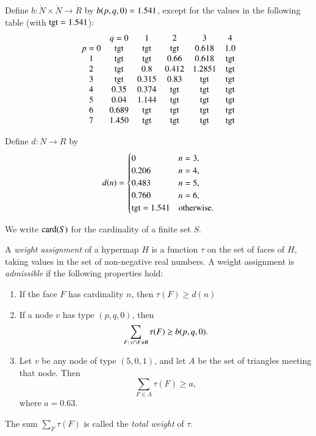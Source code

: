 \begin{definition}[b]
  Define $b:\ring{N}\times \ring{N}\to \ring{R}$ by $b(p,q,0)=1.541$,
  except for the values in the following table
  (with  ${\operatorname{tgt}}=1.541$):
  {
  \def\tx{\op{tgt}}
  $$\begin{matrix}  &q=0&1&2&3&4\\
           p=0&\tx&\tx&\tx&0.618&1.0\\
           1&\tx&\tx&0.66&0.618&\tx\\
           2&\tx&0.8&0.412&1.2851&\tx\\
           3&\tx&0.315&0.83&\tx&\tx\\
           4&0.35&0.374&\tx&\tx&\tx\\
           5&0.04&1.144&\tx&\tx&\tx\\
           6&0.689&\tx&\tx&\tx&\tx\\
           7&1.450&\tx&\tx&\tx&\tx
   \end{matrix}
   $$
   }
\end{definition}


\begin{definition}[d]
    Define $d:\ring{N}\to \ring{R}$ by
  $$d(n) = \begin{cases}
    0 & n=3, \\
    0.206 & n=4, \\
    0.483 & n=5, \\
    0.760 & n=6, \\
    {\operatorname{tgt}}=1.541 & \text{otherwise}.
  \end{cases}
  $$
\end{definition}


We write ${\operatorname{card}}(S)$ for the cardinality of a finite set $S$.


\begin{definition}
%
A {\it weight assignment\/} of a hypermap $H$ is a function $\tau$ on
the set of faces of $H$, taking values in the set of non-negative
real numbers. A weight assignment is {\it admissible} if the
following properties hold:
%
\begin{enumerate}
  \item If the face $F$ has cardinality $n$, then
        $\tau(F) \ge d(n)$
  \item If a node $v$ has type $(p,q,0)$, then
        $$\sum_{F:\,v\cap F\ne\emptyset} \tau(F) \ge b{(p,q,0)}.$$
        \label{admissible:b}
  \item Let $v$ be any node of type $(5,0,1)$, and let $A$ be the set of
triangles meeting that node.
        Then
        $$\sum_{F\in A} \tau(F)
            \ge  a,$$
   where $a=0.63$.
        \label{definition:admissible:excess}
\end{enumerate}
The sum $\sum_F \tau(F)$ is called the {\it total weight} of $\tau$.
\end{definition}

